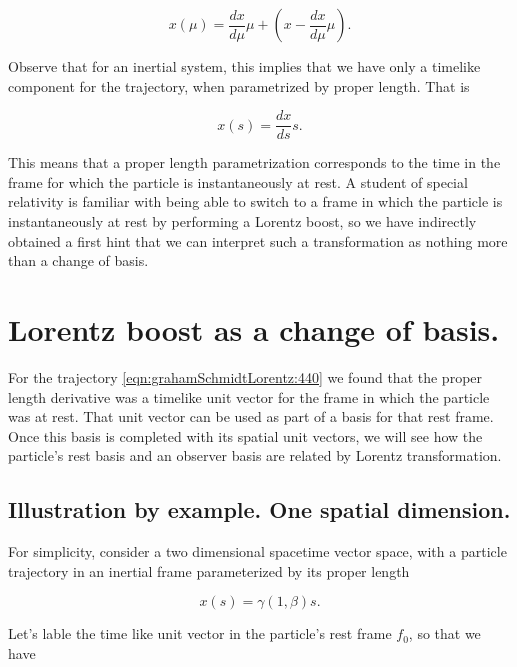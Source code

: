 \documentclass[iop,tighten]{emulateapj}
\begin{document}
\begin{equation}\label{eqn:grahamSchmidtLorentz:540}
x(\mu) = \frac{dx}{d\mu} \mu + \left( x - \frac{dx}{d\mu} \mu \right).
\end{equation}

Observe that for an inertial system, this implies that we have only a timelike component for the trajectory, when parametrized by proper length.  That is

\begin{equation}\label{eqn:grahamSchmidtLorentz:580}
x(s) = \frac{dx}{ds} s.
\end{equation}

This means that a proper length parametrization corresponds to the time in the frame for which the particle is instantaneously at rest.  A student of special relativity is familiar with being able to switch to a frame in which the particle is instantaneously at rest by performing a Lorentz boost, so we have indirectly obtained a first hint that we can interpret such a transformation as nothing more than a change of basis.

\section{Lorentz boost as a change of basis.}

For the trajectory \ref{eqn:grahamSchmidtLorentz:440} we found that the proper length derivative was a timelike unit vector for the frame in which the particle was at rest.  That unit vector can be used as part of a basis for that rest frame.  Once this basis is completed with its spatial unit vectors, we will see how the particle's rest basis and an observer basis are related by Lorentz transformation.

\subsection{Illustration by example.  One spatial dimension.}

For simplicity, consider a two dimensional spacetime vector space, with a particle trajectory in an inertial frame parameterized by its proper length

\begin{equation}\label{eqn:grahamSchmidtLorentz:600}
x(s) = \gamma (1, \beta) s.
\end{equation}

Let's lable the time like unit vector in the particle's rest frame $f_0$, so that we have
\end{document}
